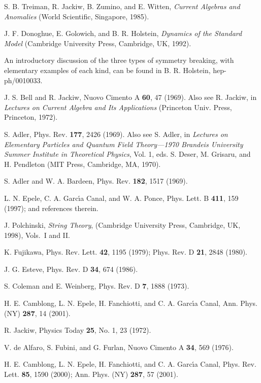 \documentclass[a4paper,twocolumn,
showpacs,amssymb,aps,prl,superscriptaddress]{revtex4}%
\begin{document}
\begin{thebibliography}{99}

S. B. Treiman, R. Jackiw, B. Zumino, and E. Witten, {\em Current
Algebras and Anomalies\/} (World Scientific, Singapore, 1985).

J. F. Donoghue, E. Golowich, and B. R. Holstein, {\em Dynamics of
the Standard Model\/}  (Cambridge University Press, Cambridge, UK,
1992).

An introductory discussion of the three types of symmetry
breaking, with elementary examples of each kind, can be found in
B. R. Holstein, hep-ph/0010033.

J. S. Bell and R. Jackiw, Nuovo Cimento A {\bf 60}, 47 (1969).
Also see R. Jackiw, in {\em Lectures on Current Algebra and Its
Applications\/} (Princeton Univ. Press, Princeton, 1972).

S. Adler, Phys. Rev. {\bf 177}, 2426 (1969). Also see S. Adler,
in {\em Lectures on Elementary Particles and Quantum Field
Theory---1970 Brandeis University Summer Institute in Theoretical
Physics\/}, Vol. 1, eds. S. Deser, M. Grisaru, and H. Pendleton
(MIT Press,  Cambridge, MA, 1970).

 S. Adler and W. A.
Bardeen, Phys. Rev. {\bf 182}, 1517 (1969).

L. N. Epele, C. A. Garc\'{\i}a Canal, and W. A. Ponce,
 Phys. Lett. B {\bf 411}, 159 (1997);
 and references therein.

J. Polchinski, {\em String Theory\/}, 
(Cambridge
University Press, Cambridge, UK, 1998), Vols.\ I and II.

K. Fujikawa, Phys. Rev. Lett. {\bf 42}, 1195 (1979); Phys. Rev. D
{\bf 21}, 2848 (1980).

J. G. Esteve, Phys. Rev. D {\bf 34}, 674 (1986).

S. Coleman and E. Weinberg,
 Phys. Rev. D {\bf 7},  1888 (1973).

H. E. Camblong, L. N. Epele, H. Fanchiotti, and C. A. Garc\'{\i}a
Canal, Ann. Phys. (NY) {\bf 287}, 14 (2001).

R. Jackiw, Physics Today {\bf 25}, No. 1, 23 (1972).

V. de Alfaro, S. Fubini, and G. Furlan, Nuovo Cimento A {\bf 34},
569 (1976).

H. E. Camblong, L. N. Epele, H. Fanchiotti, and C. A. Garc\'{\i}a
Canal, Phys. Rev. Lett. {\bf 85}, 1590 (2000);
 Ann. Phys. (NY) {\bf 287}, 57 (2001).


\end{thebibliography}
\end{document}

